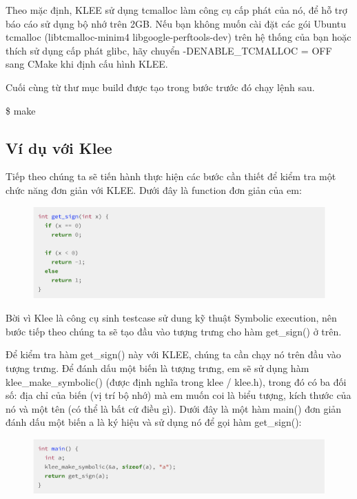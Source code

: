\documentclass[12pt,a4paper]{report}
\begin{document}
Theo mặc định, KLEE sử dụng tcmalloc làm công cụ cấp phát của nó, để hỗ trợ báo cáo sử dụng bộ nhớ trên 2GB. Nếu bạn không muốn cài đặt các gói Ubuntu tcmalloc (libtcmalloc-minim4 libgoogle-perftools-dev) trên hệ thống của bạn hoặc thích sử dụng cấp phát glibc, hãy chuyển -DENABLE\_TCMALLOC = OFF sang CMake khi định cấu hình KLEE.

Cuối cùng từ thư mục build được tạo trong bước trước đó chạy lệnh sau.

\begin{framed}
\$ make
\end{framed}

\subsection{Ví dụ với Klee}

Tiếp theo chúng ta sẽ tiến hành thực hiện các bước cần thiết để kiểm tra một chức năng đơn giản với KLEE. Dưới đây là function đơn giản của em:

\begin{figure}[ht]
\begin{center}
\includegraphics[scale=.3]{hinhanh/functionexample.png}
\end{center}
\end{figure}

Bời vì Klee là công cụ sinh testcase sử dung kỹ thuật Symbolic execution, nên bước tiếp theo chúng ta sẽ tạo đầu vào tượng trưng cho hàm get\_sign() ở trên.

Để kiểm tra hàm get\_sign() này với KLEE, chúng ta cần chạy nó trên đầu vào tượng trưng. Để đánh dấu một biến là tượng trưng, em sẽ sử dụng hàm klee\_make\_symbolic() (được định nghĩa trong klee / klee.h), trong đó có ba đối số: địa chỉ của biến (vị trí bộ nhớ) mà em muốn coi là biểu tượng, kích thước của nó và một tên (có thể là bất cứ điều gì). Dưới đây là một hàm main() đơn giản đánh dấu một biến a là ký hiệu và sử dụng nó để gọi hàm get\_sign():

\begin{figure}[ht]
\begin{center}
\includegraphics[scale=.3]{hinhanh/mainexample.png}
\end{center}
\end{figure}
\end{document}
